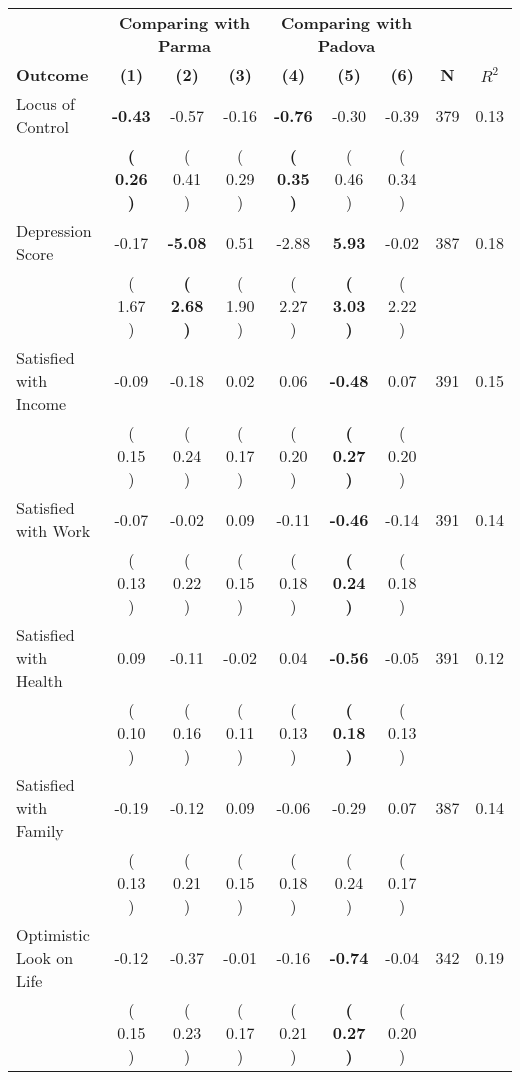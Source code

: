 \begin{tabular}{lcccccccc}
\toprule
 & \multicolumn{3}{c}{\textbf{Comparing with Parma}} & \multicolumn{3}{c}{\textbf{Comparing with Padova}} & \\
\cmidrule(lr){2-4} \cmidrule(lr){5-7} 
 \textbf{Outcome} & \textbf{(1)} & \textbf{(2)} & \textbf{(3)} & \textbf{(4)} & \textbf{(5)} & \textbf{(6)} & \textbf{N} & \textbf{$ R^2$} \\
\midrule
Locus of Control & \textbf{    -0.43} &     -0.57 &     -0.16 & \textbf{    -0.76} &     -0.30 &     -0.39 & 379 &       0.13 \\ 
 & \textbf{(     0.26 )} & (     0.41 ) & (     0.29 ) & \textbf{(     0.35 )} & (     0.46 ) & (     0.34 ) & \\
Depression Score &     -0.17 & \textbf{    -5.08} &      0.51 &     -2.88 & \textbf{     5.93} &     -0.02 & 387 &       0.18 \\ 
 & (     1.67 ) & \textbf{(     2.68 )} & (     1.90 ) & (     2.27 ) & \textbf{(     3.03 )} & (     2.22 ) & \\
Satisfied with Income &     -0.09 &     -0.18 &      0.02 &      0.06 & \textbf{    -0.48} &      0.07 & 391 &       0.15 \\ 
 & (     0.15 ) & (     0.24 ) & (     0.17 ) & (     0.20 ) & \textbf{(     0.27 )} & (     0.20 ) & \\
Satisfied with Work &     -0.07 &     -0.02 &      0.09 &     -0.11 & \textbf{    -0.46} &     -0.14 & 391 &       0.14 \\ 
 & (     0.13 ) & (     0.22 ) & (     0.15 ) & (     0.18 ) & \textbf{(     0.24 )} & (     0.18 ) & \\
Satisfied with Health &      0.09 &     -0.11 &     -0.02 &      0.04 & \textbf{    -0.56} &     -0.05 & 391 &       0.12 \\ 
 & (     0.10 ) & (     0.16 ) & (     0.11 ) & (     0.13 ) & \textbf{(     0.18 )} & (     0.13 ) & \\
Satisfied with Family &     -0.19 &     -0.12 &      0.09 &     -0.06 &     -0.29 &      0.07 & 387 &       0.14 \\ 
 & (     0.13 ) & (     0.21 ) & (     0.15 ) & (     0.18 ) & (     0.24 ) & (     0.17 ) & \\
Optimistic Look on Life &     -0.12 &     -0.37 &     -0.01 &     -0.16 & \textbf{    -0.74} &     -0.04 & 342 &       0.19 \\ 
 & (     0.15 ) & (     0.23 ) & (     0.17 ) & (     0.21 ) & \textbf{(     0.27 )} & (     0.20 ) & \\

\end{tabular}
